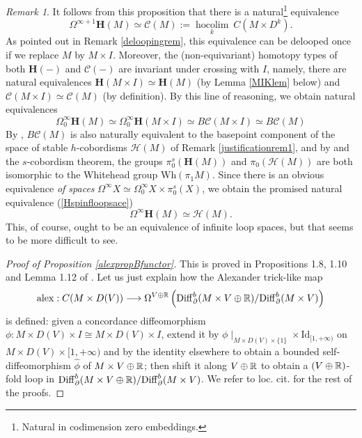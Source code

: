 \documentclass[a4paper, oneside]{amsart}
\DeclareMathOperator{\hocolim}{\operatorname{hocolim}}
\newcommand{\diff}{\mathrm{Diff}}
\newcommand{\Id}{\mathrm{Id}}
\newcommand{\1}{\mathds{1}}
\theoremstyle{remark}
\newtheorem{rem}[thm]{Remark}%
\theoremstyle{definition}
\newcommand{\R}{{\scaleobj{0.97}{\mathbb{R}}}}
\newcommand{\Wh}{\mathrm{Wh}}
\newcommand{\Hsp}{\mathbf{H}}
\numberwithin{equation}{section}
\begin{document}
\begin{rem}\label{justificationrem2}
    It follows from this proposition that there is a natural\footnote{Natural in codimension zero embeddings.} equivalence
    $$
\Omega^{\infty+1}\Hsp(M)\simeq \mathcal C(M):=\underset{k}{\hocolim}\ C(M\times D^k).
    $$
As pointed out in Remark \ref{deloopingrem}, this equivalence can be delooped once if we replace $M$ by $M\times I$. Moreover, the (non-equivariant) homotopy types of both $\Hsp(-)$ and $\mathcal{C}(-)$ are invariant under crossing with $I$, namely, there are natural equivalences $\Hsp(M\times I)\simeq \Hsp(M)$ (by Lemma \ref{MIKlem} below) and $\mathcal{C}(M\times I)\simeq \mathcal{C}(M)$ (by definition). By this line of reasoning, we obtain natural equivalences
$$
\Omega^\infty_0\Hsp(M)\simeq \Omega^\infty_0\Hsp(M\times I)\simeq B\mathcal{C}(M\times I)\simeq B\mathcal{C}(M)
$$
By \cite[Prop. 2.1]{VogellInvolution}, $B\mathcal C(M)$ is also naturally equivalent to the basepoint component of the space of stable $h$-cobordisms $\mathcal H(M)$ of Remark \ref{justificationrem1}, and by \cite[Cor. 5.6]{WWI} and the $s$-cobordism theorem, the groups $\pi_0^s(\Hsp(M))$ and $\pi_0(\mathcal{H}(M))$ are both isomorphic to the Whitehead group $\Wh(\pi_1M)$. Since there is an obvious equivalence \emph{of spaces} $\Omega^\infty X\simeq \Omega^\infty_0 X\times \pi_0^s(X)$, we obtain the promised natural equivalence (\ref{Hspinfloopsace})
    $$
\Omega^\infty\Hsp(M)\simeq \mathcal{H}(M).
    $$
    This, of course, ought to be an equivalence of infinite loop spaces, but that seems to be more difficult to see.
\end{rem}

\begin{proof}[Proof of Proposition \ref{alexpropBfunctor}]
This is proved in Propositions 1.8, 1.10 and Lemma 1.12 of \cite{WWI}. Let us just explain how the Alexander trick-like map
    $$
\mathrm{alex}: C(M\times D(V))\longrightarrow \Omega^{V\oplus\R}\left(\diff^b_\partial(M\times V\oplus\R)/\diff^b_\partial(M\times V)\right)
    $$
    is defined: given a concordance diffeomorphism $\phi: M\times D(V)\times I\cong M\times D(V)\times I$, extend it by $\phi\mid_{M\times D(V)\times \{1\}}\times \Id_{[1,+\infty)}$ on $M\times D(V)\times [1,+\infty)$ and by the identity elsewhere to obtain a bounded self-diffeomorphism $\widehat\phi$ of $M\times V\oplus \R$; then shift it along $V\oplus \R$ to obtain a $(V\oplus \R)$-fold loop in $\diff^b_\partial(M\times V\oplus\R)/\diff^b_\partial(M\times V)$. We refer to loc. cit. for the rest of the proofs.
\end{proof}
\end{document}

